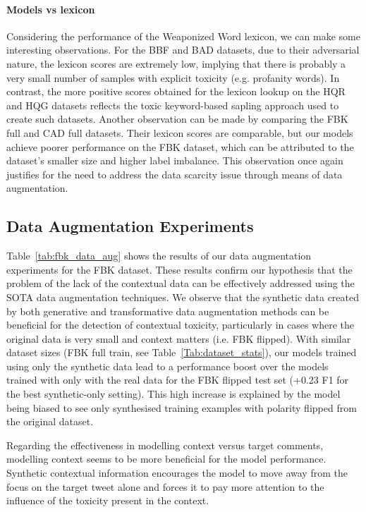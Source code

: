 \documentclass[acmsmall]{acmart}
\begin{document}
\paragraph{Models vs lexicon}
Considering the performance of the Weaponized Word lexicon, we can make some interesting observations. For the BBF and BAD datasets, due to their adversarial nature, the lexicon scores are extremely low, implying that there is probably a very small number of samples with explicit toxicity (e.g. profanity words). In contrast, the more positive scores obtained for the lexicon lookup on the HQR and HQG datasets reflects  the  toxic keyword-based sapling approach used to create such datasets. Another observation can be made by comparing the FBK full and CAD full datasets. Their lexicon scores are comparable, but our models achieve poorer performance on the FBK dataset, which can be attributed to the dataset's smaller size and higher label imbalance. This observation once again justifies for the need to address the data scarcity issue through means of data augmentation.

\subsection{Data Augmentation Experiments}
Table~\ref{tab:fbk_data_aug} shows the results of our data augmentation experiments for the FBK dataset. These results confirm our hypothesis that the problem of the lack of the contextual data can be effectively addressed using the SOTA data augmentation techniques. We observe that the synthetic data created by both generative and transformative data augmentation methods can be beneficial for the detection of contextual toxicity, particularly in cases where the original data is very small and context matters (i.e. FBK flipped). With similar dataset sizes (FBK full train, see Table~\ref{Tab:dataset_stats}), our models trained using only the synthetic data lead to a performance boost over the models trained with only with the real data for the FBK flipped test set (+0.23 F1 for the best synthetic-only setting). This high increase is explained by the model being biased to see only synthesised training examples with polarity flipped from the original dataset.

Regarding the effectiveness in modelling context versus target comments, modelling context seems to be more beneficial for the model performance. Synthetic contextual information encourages the model to move away from the focus on the target tweet alone and forces it to pay more attention to the influence of the toxicity present in the context. 
\end{document}
